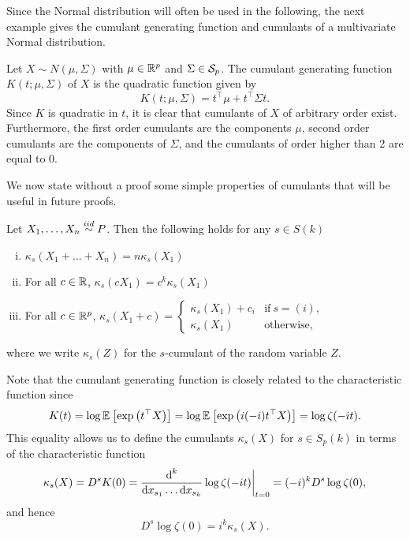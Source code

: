 Since the Normal distribution will often be used in the following, the next example gives the cumulant generating function and cumulants of a multivariate Normal distribution.
\begin{example} \label{ex-cumulants-mvn}
    Let $X \sim N(\mu, \Sigma)$ with $\mu \in {\mathbb{R}^p}$ and $\Sigma \in {\mathcal{S}_p}$. The cumulant generating function $K(t; \mu, \Sigma)$ of $X$ is the quadratic function given by
    \begin{equation*}
        K(t; \mu, \Sigma) = t^\top\mu + t^\top\Sigma t.
    \end{equation*}
    Since $K$ is quadratic in $t$, it is clear that cumulants of $X$ of arbitrary order exist. Furthermore, the first order cumulants are the components $\mu$, second order cumulants are the components of $\Sigma$, and the cumulants of order higher than 2 are equal to 0.
\end{example}

We now state without a proof some simple properties of cumulants that will be useful in future proofs.
\begin{lemma} \label{lem-cumulants-props}
    Let $X_1, \ldots, X_n \stackrel{iid}{\sim} P$. Then the following holds for any $s \in S(k)$
    \begin{enumerate}[i.]
        \item {
        $\kappa_s(X_1 + \ldots + X_n) = n\kappa_s(X_1)$
        }
        \item {
            For all $c \in \mathbb{R}$, $\kappa_s(c X_1) = c^k\kappa_s(X_1)$
        }
        \item {
            For all $c \in {\mathbb{R}^p}$, $\kappa_s(X_1 + c) =
            \begin{cases}
                \kappa_s(X_1) + c_i &\text{if}\ s=(i),\\
                \kappa_s(X_1)& \text{otherwise},
            \end{cases}$
        }
    \end{enumerate}
    where we write $\kappa_s(Z)$ for the $s$-cumulant of the random variable $Z$.
\end{lemma}

Note that the cumulant generating function is closely related to the characteristic function since
\begin{equation*}
    K(t) 
    = \log \mathbb{E}_{}\left[\exp\left(t^\top X\right)\right] 
    = \log \mathbb{E}_{}\left[\exp\left(i (-i)t^\top X\right)\right]
    = \log \zeta(-it).
\end{equation*}
This equality allows us to define the cumulants $\kappa_s(X)$ for $s \in S_p(k)$ in terms of the characteristic function
\begin{equation*}
    \kappa_s(X) = D^s K(0) 
    = \frac{\text{d}^k}{\text{d} x_{s_1} \ldots \text{d} x_{s_k}} \log \zeta(-it) \bigg|_{t=0}
    = (-i)^{k} D^s \log \zeta(0),
\end{equation*}
and hence
\begin{equation*}
    D^s \log \zeta(0) = i^k \kappa_s(X).
\end{equation*}